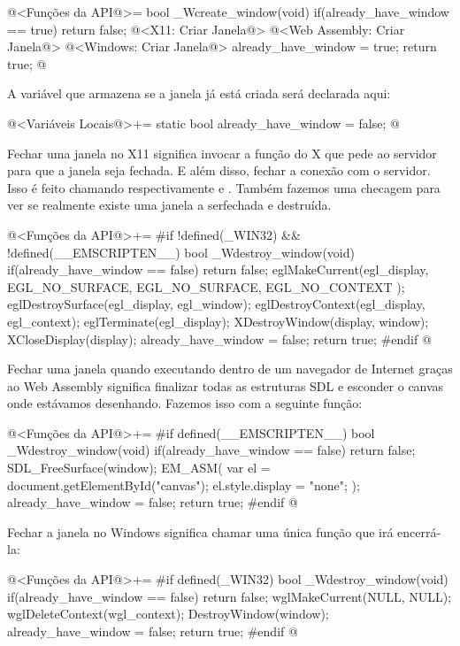 \iniciocodigo
@<Funções da API@>=
bool _Wcreate_window(void){
  if(already_have_window == true)
    return false;
  @<X11: Criar Janela@>
  @<Web Assembly: Criar Janela@>
  @<Windows: Criar Janela@>
  already_have_window = true;
  return true;
}
@
\fimcodigo

A variável que armazena se a janela já está criada será declarada
aqui:

\iniciocodigo
@<Variáveis Locais@>+=
static bool already_have_window = false;
@
\fimcodigo


Fechar uma janela no X11 significa invocar a função do X que pede ao
servidor para que a janela seja fechada. E além disso, fechar a
conexão com o servidor. Isso é feito chamando
respectivamente 
e . Também fazemos uma checagem para ver se
realmente existe uma janela a serfechada e destruída.

\iniciocodigo
@<Funções da API@>+=
#if !defined(_WIN32) && !defined(__EMSCRIPTEN__)
bool _Wdestroy_window(void){
  if(already_have_window == false)
    return false;
  eglMakeCurrent(egl_display, EGL_NO_SURFACE, EGL_NO_SURFACE,
                 EGL_NO_CONTEXT );
  eglDestroySurface(egl_display, egl_window);
  eglDestroyContext(egl_display, egl_context);
  eglTerminate(egl_display);
  XDestroyWindow(display, window);
  XCloseDisplay(display);
  already_have_window = false;
  return true;
}
#endif
@
\fimcodigo


Fechar uma janela quando executando dentro de um navegador de Internet
graças ao Web Assembly significa finalizar todas as estruturas SDL e
esconder o canvas onde estávamos desenhando. Fazemos isso com a
seguinte função:

\iniciocodigo
@<Funções da API@>+=
#if defined(__EMSCRIPTEN__)
bool _Wdestroy_window(void){
  if(already_have_window == false)
    return false;
  SDL_FreeSurface(window);
  EM_ASM(
    var el = document.getElementById("canvas");
    el.style.display = "none";
  );
  already_have_window = false;
  return true;
}
#endif
@
\fimcodigo


Fechar a janela no Windows significa chamar uma única função que irá
encerrá-la:

\iniciocodigo
@<Funções da API@>+=
#if defined(_WIN32)
bool _Wdestroy_window(void){
  if(already_have_window == false)
    return false;
  wglMakeCurrent(NULL, NULL);
  wglDeleteContext(wgl_context);
  DestroyWindow(window);
  already_have_window = false;
  return true;
}
#endif
@
\fimcodigo

